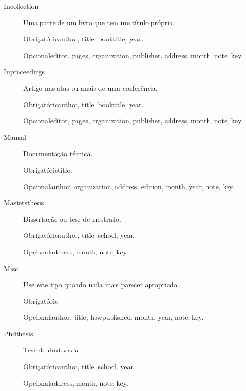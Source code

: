 \documentclass[article,openany]{memoir}
\newcommand{\obrigatorios}{%
   \par Obrigatório\dotfill\ignorespaces}
\newcommand{\opcionais}{
   \par Opcional\dotfill\ignorespaces}
\begin{document}
\begin{description}

\item[Incollection]
Uma parte de um livro que tem um título próprio.


  \obrigatorios author, title, booktitle, year.

  \opcionais editor, pages, organization, publisher, address, month, note, key.


\item[Inproceedings]
Artigo nas atas ou anais de uma conferência.

  \obrigatorios author, title, booktitle, year.

  \opcionais editor, pages, organization, publisher, address, month, note, key.


\item[Manual]
Documentação técnica.

  \obrigatorios title.

  \opcionais author, organization, address, edition, month, year, note, key.


\item[Mastersthesis]
Dissertação ou tese de mestrado.

  \obrigatorios author, title, school, year.

  \opcionais address, month, note, key.


\item[Misc]
Use este tipo quando nada mais parecer apropriado.

  \obrigatorios 

  \opcionais author, title, howpublished, month, year, note, key.


\item[Phdthesis]
Tese de doutorado.

  \obrigatorios author, title, school, year.

  \opcionais address, month, note, key.



\end{description}
\end{document}
